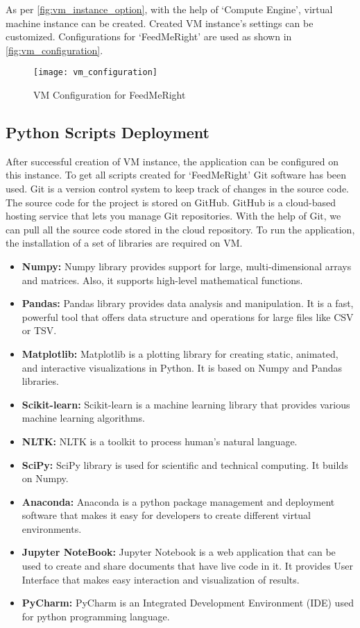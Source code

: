 \noindent As per \autoref{fig:vm_instance_option}, with the help of `Compute Engine', virtual machine instance can be created. Created VM instance's settings can be customized. Configurations for `FeedMeRight' are used as shown in \autoref{fig:vm_configuration}.
\begin{figure}[H]
	\centering
	\texttt{[image: vm\_configuration]}
	\caption{VM Configuration for FeedMeRight}
	\label{fig:vm_configuration}
\end{figure}

\subsection{Python Scripts Deployment}
After successful creation of VM instance, the application can be configured on this instance. To get all scripts created for `FeedMeRight' Git software has been used. Git is a version control system to keep track of changes in the source code. The source code for the project is stored on GitHub. GitHub is a cloud-based hosting service that lets you manage Git repositories. With the help of Git, we can pull all the source code stored in the cloud repository. To run the application, the installation of a set of libraries are required on VM. 

\begin{itemize}
\item \textbf{Numpy: } Numpy library provides support for large, multi-dimensional arrays and matrices. Also, it supports high-level mathematical functions.
\item \textbf{Pandas: } Pandas library provides data analysis and manipulation. It is a fast, powerful tool that offers data structure and operations for large files like CSV or TSV.
\item \textbf{Matplotlib: } Matplotlib is a plotting library for creating static, animated, and interactive visualizations in Python. It is based on Numpy and Pandas libraries.
\item \textbf{Scikit-learn: } Scikit-learn is a machine learning library that provides various machine learning algorithms.
\item \textbf{NLTK: } NLTK is a toolkit to process human's natural language.
\item \textbf{SciPy: } SciPy library is used for scientific and technical computing. It builds on Numpy. 
\item \textbf{Anaconda: } Anaconda is a python package management and deployment software that makes it easy for developers to create different virtual environments.  
\item \textbf{Jupyter NoteBook: } Jupyter Notebook is a web application that can be used to create and share documents that have live code in it. It provides User Interface that makes easy interaction and visualization of results. 
\item \textbf{PyCharm: } PyCharm is an Integrated Development Environment (IDE) used for python programming language. 
\end{itemize}  